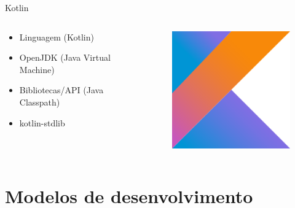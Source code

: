 \documentclass[aspectratio=169]{beamer}
\begin{document}
\begin{frame}[fragile]{Kotlin}
    \begin{columns}
        \begin{column}{0.5\textwidth}
            \begin{itemize}
                \item Linguagem (Kotlin)
                \item OpenJDK (Java Virtual Machine)
                \item Bibliotecas/API (Java Classpath)
                \item kotlin-stdlib
            \end{itemize}
        \end{column}
        \begin{column}{0.5\textwidth}  %
            \begin{figure}
                \centering
                \includegraphics[width=0.4\linewidth]{Images/kotlin}
            \end{figure}
        \end{column}
    \end{columns}
\end{frame}


{
    \section{Modelos de desenvolvimento}
}
\end{document}
